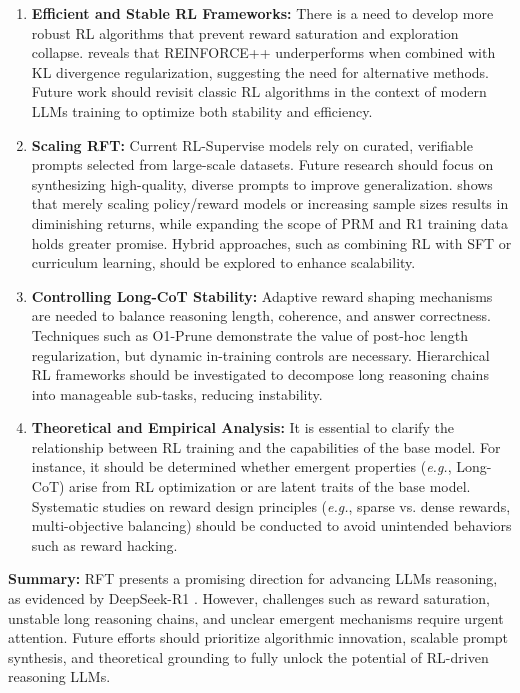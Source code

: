 \begin{enumerate}[itemindent=0em]

\item \textbf{Efficient and Stable RL Frameworks:} There is a need to develop more robust RL algorithms that prevent reward saturation and exploration collapse. \cite{yeo2025demystifying} reveals that REINFORCE++ \cite{reinforce_plusplus} underperforms when combined with KL divergence regularization, suggesting the need for alternative methods. 
Future work should revisit classic RL algorithms in the context of modern LLMs training to optimize both stability and efficiency.

\item \textbf{Scaling RFT:} Current RL-Supervise models rely on curated, verifiable prompts selected from large-scale datasets. 
Future research should focus on synthesizing high-quality, diverse prompts to improve generalization. \cite{RLHF_Scaling} shows that merely scaling policy/reward models or increasing sample sizes results in diminishing returns, while expanding the scope of PRM and R1 training data holds greater promise. 
Hybrid approaches, such as combining RL with SFT or curriculum learning, should be explored to enhance scalability.

\item \textbf{Controlling Long-CoT Stability:} Adaptive reward shaping mechanisms are needed to balance reasoning length, coherence, and answer correctness. 
Techniques such as O1-Prune \cite{o1_pruner} demonstrate the value of post-hoc length regularization, but dynamic in-training controls are necessary. 
Hierarchical RL frameworks should be investigated to decompose long reasoning chains into manageable sub-tasks, reducing instability.

\item \textbf{Theoretical and Empirical Analysis:} It is essential to clarify the relationship between RL training and the capabilities of the base model. 
For instance, it should be determined whether emergent properties (\emph{e.g.}, Long-CoT) arise from RL optimization or are latent traits of the base model. Systematic studies on reward design principles (\emph{e.g.}, sparse vs. dense rewards, multi-objective balancing) should be conducted to avoid unintended behaviors such as reward hacking.

\end{enumerate}

\noindent\textbf{Summary:} RFT presents a promising direction for advancing LLMs reasoning, as evidenced by DeepSeek-R1 \cite{Deepseek-R1}. 
However, challenges such as reward saturation, unstable long reasoning chains, and unclear emergent mechanisms require urgent attention. 
Future efforts should prioritize algorithmic innovation, scalable prompt synthesis, and theoretical grounding to fully unlock the potential of RL-driven reasoning LLMs.





